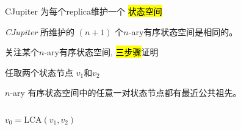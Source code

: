 \begin{frame}{}
  \begin{center}
    {\large CJupiter 为每个replica维护一个 \hl{ 状态空间}}
  \end{center}

\end{frame}

\begin{frame}{}
  \begin{center}
    \begin{prop}
      {\large \emph{CJupiter} 所维护的 $(n+1)$ 个$n$-ary有序状态空间是相同的。}
    \end{prop}

    \resizebox{0.50\textwidth}{!}{}

  \end{center}
\end{frame}

\begin{frame}{}
  \centerline{}
\end{frame}

\begin{frame}{}
  \begin{center}
    {\large 关注某个$n$-ary有序状态空间, \hl{三步骤}证明}
  \end{center}

\end{frame}

\begin{frame}{}
  \centerline{ 任取两个状态节点 $v_1$和$v_2$}

  \begin{clemma}
    $n$-ary 有序状态空间中的任意一对状态节点都有最近公共祖先。
  \end{clemma}

  \begin{columns}
	\[
	  v_0 = \text{LCA}(v_1, v_2)
	\]
  \end{columns}
\end{frame}

